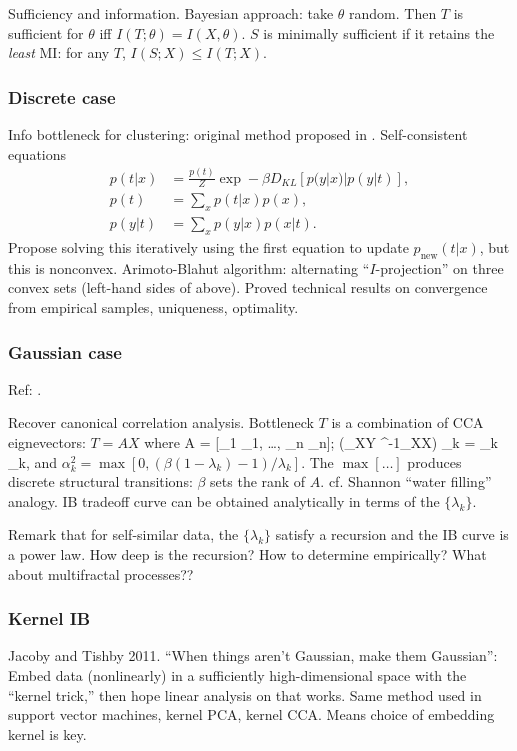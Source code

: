 \documentclass[notitlepage,openany,11pt]{report}
\numberwithin{equation}{section}
\theoremstyle{plain}%
\begin{document}
Sufficiency and information. Bayesian approach: take $\theta$ random. Then $T$ is sufficient for $\theta$ iff $I(T;\theta) = I(X, \theta)$. $S$ is minimally sufficient if it retains the \emph{least} MI: for any $T$, $I(S;X) \leq I(T;X)$.

\subsubsection{Discrete case} 
Info bottleneck for clustering: original method proposed in \cite{TishbyEtAl:99}. Self-consistent equations
\begin{align*}
p(t|x) &= \frac{p(t)}{Z} \exp -\beta D_{KL}[p(y|x) | p(y|t)], \\
p(t) &= \sum_{x} p(t|x) p(x), \\
p(y|t) &= \sum_{x} p(y|x) p(x|t).
\end{align*}
Propose solving this iteratively using the first equation to update $p_{\text{new}}(t|x)$, but this is nonconvex. Arimoto-Blahut algorithm: alternating ``$I$-projection'' on three convex sets (left-hand sides of above). Proved technical results on convergence from empirical samples, uniqueness, optimality. 

\subsubsection{Gaussian case} 

Ref: \cite{ChechikEtAl:05}. 

Recover canonical correlation analysis. Bottleneck $T$ is a combination of CCA eignevectors: $T=AX$ where
\be
A = [\alpha_{1} _{1}, \ldots, \alpha_{n} _{n}]; \qquad (\Sigma_{XY} \Sigma^{-1}_{XX}) _{k} = \lambda_{k} _{k},
\ee
and $\alpha_{k}^{2} = \max[0, (\beta(1-\lambda_{k}) -1 )/\lambda_{k}]$. The $\max[\ldots]$ produces discrete structural transitions: $\beta$ sets the rank of $A$. cf. Shannon ``water filling'' analogy. IB tradeoff curve can be obtained analytically in terms of the $\{ \lambda_{k} \}$. 

Remark that for self-similar data, the $\{ \lambda_{k} \}$ satisfy a recursion and the IB curve is a power law. How deep is the recursion? How to determine empirically? What about multifractal processes??

\subsubsection{Kernel IB} Jacoby and Tishby 2011. ``When things aren't Gaussian, make them Gaussian'': Embed data (nonlinearly) in a sufficiently high-dimensional space with the ``kernel trick,'' then hope linear analysis on that works. Same method used in support vector machines, kernel PCA, kernel CCA. Means choice of embedding kernel is key.
\end{document}
